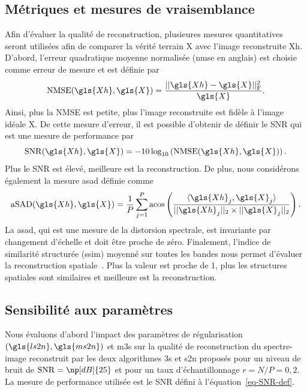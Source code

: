 \subsection{Métriques et mesures de vraisemblance}\label{sec-metriques}

Afin d'évaluer la qualité de reconstruction, plusieures mesures quantitatives seront utilisées afin de comparer la vérité terrain \gls{X} avec l'image reconstruite \gls{Xh}. D'abord, l'erreur quadratique moyenne normalisée (\gls{nmse} en anglais) est choisie comme erreur de mesure et est définie par
\begin{equation}
    \mathrm{NMSE}(\gls{Xh}, \gls{X}) = \frac{\frobnorm{\gls{Xh} - \gls{X}}}{\gls{X}}.
\end{equation}
Ainsi, plus la NMSE est petite, plus l'image reconstruite est fidèle à l'image idéale \gls{X}. De cette mesure d'erreur, il est possible d'obtenir de définir le SNR qui est une mesure de performance par
\begin{equation}\label{eq-SNR-def}
\mathrm{SNR}(\gls{Xh}, \gls{X}) = -10\log_{10}\left( \mathrm{NMSE}(\gls{Xh}, \gls{X}) \right).
\end{equation}
Plus le SNR est élevé, meilleure est la reconstruction. De plus, nous considérons également la mesure \gls{asad} définie comme~\cite{keshava2004distance,sohn2002supervised}
\begin{equation}\label{eq-aSAD-def}
\mathrm{aSAD}(\gls{Xh},\gls{X}) = \frac{1}{P}\sum_{j=1}^{P}\mathrm{acos}\left(
\frac
{\langle\gls{Xh}_j, \gls{X}_j\rangle}
{||\gls{Xh}_j||_2\times||\gls{X}_j||_2}
\right).
\end{equation}
La \gls{asad}, qui est une mesure de la distorsion spectrale, est invariante par changement d'échelle et doit être proche de zéro. Finalement, l'indice de similarité structurée (\gls{ssim}) moyenné sur toutes les bandes nous permet d'évaluer la reconstruction spatiale~\cite{wang2009mean,wang2004image}. Plus la valeur est proche de 1, plus les structures spatiales sont similaires et meilleure est la reconstruction.


\subsection{Sensibilité aux paramètres}\label{sec-lr-param-tuning}

Nous évaluons d'abord l'impact des paramètres de régularisation $(\gls{ls2n}, \gls{ms2n})$ et \gls{m3s} sur la qualité de reconstruction du spectre-image reconstruit par les deux algorithmes \gls{3s} et \gls{s2n} proposés pour un niveau de bruit de $\mathrm{SNR} = \np[dB]{25}$ et pour un taux d'échantillonnage $r=N/P=0,2$. La mesure de performance utilisée est le SNR défini à l'équation~\eqref{eq-SNR-def}.


